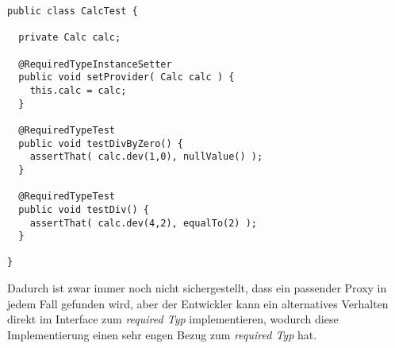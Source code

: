 \begin{lstlisting}[style = java, caption = Test CalcTest, captionpos = b, label = lst_testklasse_calc]
public class CalcTest {

  private Calc calc;
  
  @RequiredTypeInstanceSetter
  public void setProvider( Calc calc ) {
    this.calc = calc;
  }

  @RequiredTypeTest
  public void testDivByZero() {
    assertThat( calc.dev(1,0), nullValue() );
  }
  
  @RequiredTypeTest
  public void testDiv() {
    assertThat( calc.dev(4,2), equalTo(2) );
  }

}
\end{lstlisting}
\noindent
Dadurch ist zwar immer noch nicht sichergestellt, dass ein passender Proxy in jedem Fall gefunden wird, aber der Entwickler kann ein alternatives Verhalten direkt im \Gls{Interface} zum \emph{required Typ} implementieren, wodurch diese Implementierung einen sehr engen Bezug zum \emph{required Typ} hat.